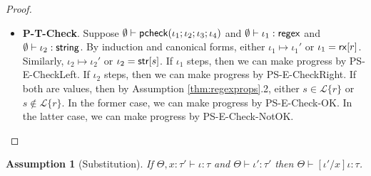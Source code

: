 \documentclass[11pt,leqno]{article}
\newtheorem{ass}[tr]{Assumption}
\theoremstyle{definition}
\newcommand{\Lagr}{\mathcal{L}}
\newcommand{\lang}[1]{\Lagr\{#1\}}
\newcommand{\tcheck}[4]{{\sf pcheck}(#1; #2; #3; #4)}
\renewcommand{\tstr}[1]{{{\sf str}[#1]}}
\newcommand{\rx}[1]{ {\sf rx}[#1] }
\newcommand{\str}{{\sf string}}
\newcommand{\regex}{{\sf regex}}
\begin{document}
\begin{proof}
\begin{itemize}[label=$ $,itemsep=1ex]
\item \textbf{P-T-Check}.
Suppose $\emptyset \vdash \tcheck{\iota_1}{\iota_2}{\iota_3}{\iota_4}$ and $\emptyset \vdash \iota_1 : \regex$ and $\emptyset \vdash \iota_2 : \str$. By induction and canonical forms, either $\iota_1 \mapsto \iota_1'$ or $\iota_1 = \rx{r}$. Similarly, $\iota_2 \mapsto \iota_2'$ or $\iota_2 = \tstr{s}$. If $\iota_1$ steps, then we can make progress by PS-E-CheckLeft. If $\iota_2$ steps, then we can make progress by PS-E-CheckRight. If both are values, then by Assumption \ref{thm:regexprops}.2, either $s \in \lang{r}$ or $s\notin\lang{r}$. In the former case, we can make progress by PS-E-Check-OK. In the latter case, we can make progress by PS-E-Check-NotOK.
\end{itemize}
\end{proof}

\begin{ass}[Substitution] \label{lem:psubst}
If $\Theta, x : \tau' \vdash \iota : \tau$ and $\Theta \vdash \iota' : \tau'$
then $\Theta \vdash [\iota' / x]\iota : \tau$.
\end{ass}
\end{document}
